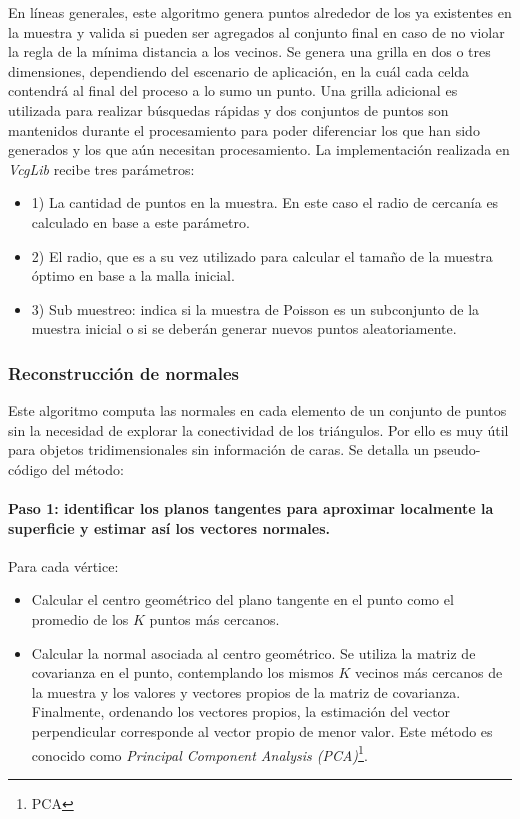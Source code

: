 En líneas generales, este algoritmo genera puntos alrededor de los ya existentes en la muestra y valida si pueden ser agregados al conjunto final en caso de no violar la regla de la mínima distancia a los vecinos. Se genera una grilla en dos o tres dimensiones, dependiendo del escenario de aplicación, en la cuál cada celda contendrá al final del proceso a lo sumo un punto. Una grilla adicional es utilizada para realizar búsquedas rápidas y dos conjuntos de puntos son mantenidos durante el procesamiento para poder diferenciar los que han sido generados y los que aún necesitan procesamiento.
La implementación realizada en \emph{VcgLib} recibe tres parámetros:
\begin{itemize}
  \item 1) La cantidad de puntos en la muestra. En este caso el radio de cercanía es calculado en base a este parámetro.
  \item 2) El radio, que es a su vez utilizado para calcular el tamaño de la muestra óptimo en base a la malla inicial.
  \item 3) Sub muestreo: indica si la muestra de Poisson es un subconjunto de la muestra inicial o si se deberán generar nuevos puntos aleatoriamente.
\end{itemize}

\subsubsection{Reconstrucción de normales}

Este algoritmo computa las normales en cada elemento de un conjunto de puntos sin la necesidad de explorar la conectividad de los triángulos. Por ello es muy útil para objetos tridimensionales sin información de caras.
Se detalla un pseudo-código del método:


\paragraph{Paso 1: identificar los planos tangentes para aproximar localmente la superficie y estimar así los vectores normales.}
Para cada vértice:
  \begin{itemize}
    \item Calcular el centro geométrico del plano tangente en el punto como el promedio de los $K$ puntos más cercanos.
    \item Calcular la normal asociada al centro geométrico. Se utiliza la matriz de covarianza en el punto, contemplando los mismos $K$ vecinos más cercanos de la muestra y los valores y vectores propios de la matriz de covarianza. Finalmente, ordenando los vectores propios, la estimación del vector perpendicular corresponde al vector propio de menor valor. Este método es conocido como \emph{Principal Component Analysis (PCA)}\footnote{PCA}.
  \end{itemize}

